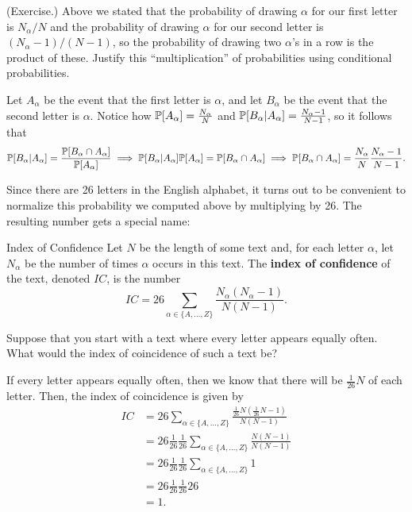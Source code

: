 \documentclass[letterpaper]{article}
\begin{document}
\begin{mdframed}
    (Exercise.) Above we stated that the probability of drawing $\alpha$ for our first letter is $N_\alpha / N$ and the probability of drawing $\alpha$ for our second letter is $(N_\alpha - 1) / (N - 1)$, so the probability of drawing two $\alpha$'s in a row is the product of these. Justify this ``multiplication'' of probabilities using conditional probabilities.

    \begin{mdframed}
        Let $A_{\alpha}$ be the event that the first letter is $\alpha$, and let $B_\alpha$ be the event that the second letter is $\alpha$. Notice how $\mathbb{P}[A_{\alpha}] = \frac{N_\alpha}{N}$ and $\mathbb{P}[B_\alpha | A_\alpha] = \frac{N_\alpha - 1}{N - 1}$, so it follows that \[\mathbb{P}[B_\alpha | A_\alpha] = \frac{\mathbb{P}[B_\alpha \cap A_\alpha]}{\mathbb{P}[A_\alpha]} \implies \mathbb{P}[B_\alpha | A_\alpha] \mathbb{P}[A_\alpha] = \mathbb{P}[B_\alpha \cap A_\alpha] \implies \mathbb{P}[B_\alpha \cap A_\alpha] = \frac{N_\alpha}{N} \frac{N_\alpha - 1}{N - 1}.\]
    \end{mdframed}
\end{mdframed}
Since there are 26 letters in the English alphabet, it turns out to be convenient to normalize this probability we computed above by multiplying by 26. The resulting number gets a special name: 
\begin{definition}{Index of Confidence}{}
    Let $N$ be the length of some text and, for each letter $\alpha$, let $N_\alpha$ be the number of times $\alpha$ occurs in this text. The \textbf{index of confidence} of the text, denoted $IC$, is the number \[IC = 26 \sum_{\alpha \in \{A, \hdots, Z\}} \frac{N_\alpha (N_\alpha - 1)}{N(N - 1)}.\]
\end{definition}

\begin{mdframed}
    Suppose that you start with a text where every letter appears equally often. What would the index of coincidence of such a text be?

    \begin{mdframed}
        If every letter appears equally often, then we know that there will be $\frac{1}{26}N$ of each letter. Then, the index of coincidence is given by 
        \begin{equation*}
            \begin{aligned}
                IC &= 26 \sum_{\alpha \in \{A, \hdots, Z\}} \frac{\frac{1}{26}N (\frac{1}{26}N - 1)}{N(N - 1)} \\ 
                    &= 26\frac{1}{26}\frac{1}{26} \sum_{\alpha \in \{A, \hdots, Z\}} \frac{N (N - 1)}{N(N - 1)} \\ 
                    &= 26\frac{1}{26}\frac{1}{26} \sum_{\alpha \in \{A, \hdots, Z\}} 1 \\ 
                    &= 26\frac{1}{26}\frac{1}{26} 26 \\ 
                    &= 1.
            \end{aligned}
        \end{equation*}
    \end{mdframed}
\end{mdframed}
\end{document}
